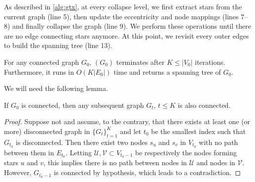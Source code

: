 As described in \autoref{alg:gtx}, at every collapse level, we first extract stars from the current
graph (line 5), then update the eccentricity and node mappings (lines 7--8) and finally collapse the
graph (line 9). We perform these operations until there are no edge connecting stars anymore. At
this point, we revisit every outer edges to build the spanning tree (line 13).

\begin{prop}
  \label{prop:gtx_correct}
  For any connected graph $G_0$, \gtx$(G_0)$ terminates after $K\leq |V_0|$ iterations. Furthermore,
  it runs in $O(K|E_0|)$ time and returns a spanning tree of $G_0$.
\end{prop}
We will need the following lemma.
\begin{lemma}
  \label{lem:gtx_stay_connected}
  If $G_0$ is connected, then any subsequent graph $G_t,\, t \leq K$ is also connected.
\end{lemma}
\begin{proof}
 Suppose not and assume, to the contrary, that there exists at least one (or more) disconnected
 graph in $\{G_t\}_{t=1}^K$ and let $t_0$ be the smallest index such that $G_{t_0}$ is disconnected.
 Then there exist two nodes $s_u$ and $s_v$ in $V_{t_0}$ with no path between them in $E_{t_0}$.
 Letting $\mathcal{U}, \mathcal{V} \subset V_{t_0-1}$ be respectively the nodes forming stars $u$
 and $v$, this implies there is no path between nodes in $\mathcal{U}$ and nodes in $\mathcal{V}$.
 However, $G_{t_0-1}$ is connected by hypothesis, which leads to a contradiction.
\end{proof}

